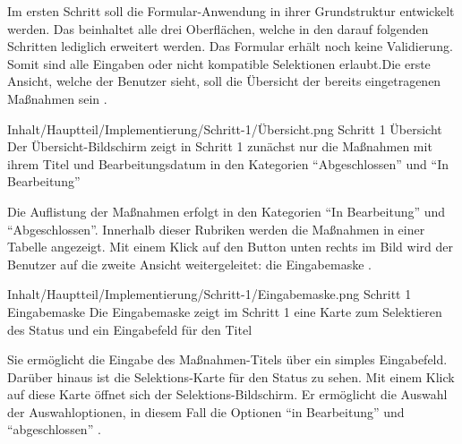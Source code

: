Im ersten Schritt soll die Formular-Anwendung in ihrer Grundstruktur entwickelt werden.  Das beinhaltet alle drei Oberflächen, welche in den darauf folgenden Schritten lediglich erweitert werden.  Das Formular erhält noch keine  Validierung. Somit sind alle Eingaben oder nicht kompatible Selektionen erlaubt.Die erste Ansicht, welche der Benutzer sieht, soll die Übersicht der bereits eingetragenen Maßnahmen sein \Abb{\ref{fig:Schritt1Uebersicht}}.

\begin{alexfigure}{Inhalt/Hauptteil/Implementierung/Schritt-1/Übersicht.png}
  {Schritt 1 Übersicht}
  {Der Übersicht-Bildschirm zeigt in  Schritt 1 zunächst nur die Maßnahmen mit ihrem Titel und Bearbeitungsdatum in den Kategorien \enquote{Abgeschlossen} und \enquote{In Bearbeitung}}

  \label{fig:Schritt1Uebersicht}

\end{alexfigure}

Die Auflistung der Maßnahmen erfolgt in den Kategorien \enquote{In Bearbeitung} und \enquote{Abgeschlossen}. Innerhalb dieser Rubriken werden die Maßnahmen in einer Tabelle angezeigt. Mit einem Klick auf den Button unten rechts im Bild wird der Benutzer auf die zweite Ansicht weitergeleitet: die Eingabemaske \Abb{\ref{fig:Schritt1Eingabemaske}}.

\begin{alexfigure}{Inhalt/Hauptteil/Implementierung/Schritt-1/Eingabemaske.png}
  {Schritt 1 Eingabemaske}
  {Die Eingabemaske zeigt im Schritt 1 eine Karte zum Selektieren des Status und ein Eingabefeld für den Titel}

  \label{fig:Schritt1Eingabemaske}

\end{alexfigure}

Sie ermöglicht die Eingabe des Maßnahmen-Titels über ein simples Eingabefeld. Darüber hinaus ist die Selektions-Karte für den Status zu sehen. Mit einem Klick auf diese Karte öffnet sich der Selektions-Bildschirm. Er ermöglicht die Auswahl der Auswahloptionen, in diesem Fall die Optionen \enquote{in Bearbeitung} und \enquote{abgeschlossen}
\Abb{\ref{fig:Schritt1SelektionsBildschirmStatus}}.

